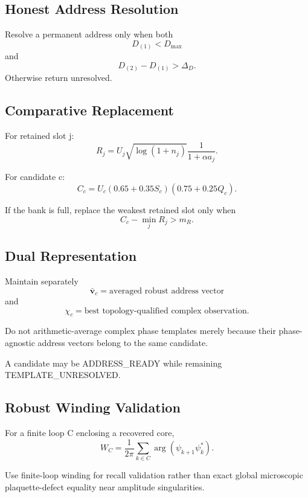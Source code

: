 

\subsection{Honest Address Resolution}

Resolve a permanent address only when both
\[
D_{(1)} < D_{\max}
\]
and
\[
D_{(2)}-D_{(1)} > \Delta_D.
\]
Otherwise return unresolved.

\subsection{Comparative Replacement}

For retained slot j:
\[
R_j =
U_j\sqrt{\log(1+n_j)}
\frac{1}{1+\alpha a_j}.
\]

For candidate c:
\[
C_c =
U_c(0.65+0.35S_c)(0.75+0.25Q_c).
\]

If the bank is full, replace the weakest retained slot only when
\[
C_c-\min_j R_j > m_R.
\]

\subsection{Dual Representation}

Maintain separately
\[
\bar{\mathbf v}_c
=
\text{averaged robust address vector}
\]
and
\[
\chi_c
=
\text{best topology-qualified complex observation}.
\]

Do not arithmetic-average complex phase templates merely because their phase-agnostic
address vectors belong to the same candidate.

A candidate may be ADDRESS_READY while remaining TEMPLATE_UNRESOLVED.

\subsection{Robust Winding Validation}

For a finite loop C enclosing a recovered core,
\[
W_C =
\frac{1}{2\pi}
\sum_{k\in C}
\arg(\psi_{k+1}\psi_k^*).
\]

Use finite-loop winding for recall validation rather than exact global microscopic
plaquette-defect equality near amplitude singularities.
